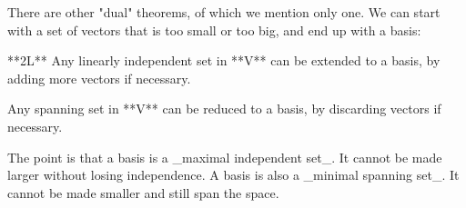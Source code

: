 There are other "dual" theorems, of which we mention only one. We can start with a set of vectors that is too small or too big, and end up with a basis:

**2L** Any linearly independent set in **V** can be extended to a basis, by adding more vectors if necessary.

Any spanning set in **V** can be reduced to a basis, by discarding vectors if necessary.

The point is that a basis is a _maximal independent set_. It cannot be made larger without losing independence. A basis is also a _minimal spanning set_. It cannot be made smaller and still span the space.

 